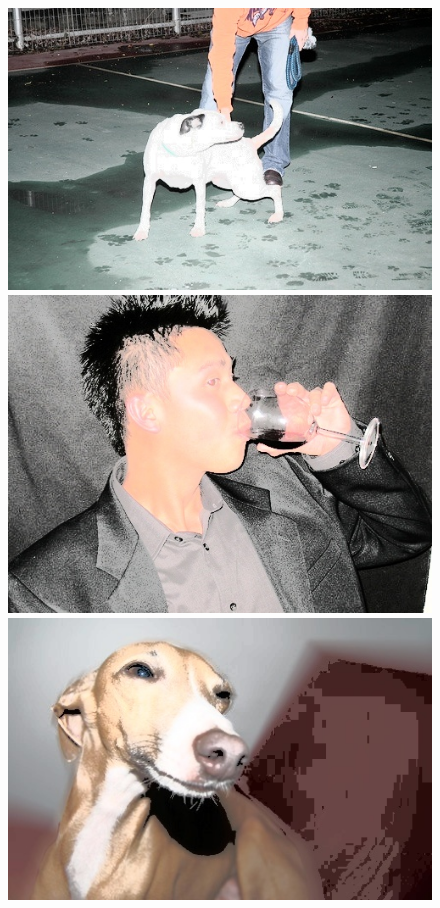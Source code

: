 \begin{appendices}
\begin{figure}[htb]
\begin{minipage}{0.19\textwidth}
\end{minipage}
\begin{minipage}{0.19\textwidth}
\includegraphics[width=\textwidth]{images/anomalien/HA/000777.jpg}
\end{minipage}
\begin{minipage}{0.19\textwidth}
\includegraphics[width=\textwidth]{images/anomalien/HA/001608.jpg}
\end{minipage}
\begin{minipage}{0.19\textwidth}
\includegraphics[width=\textwidth]{images/anomalien/HA/003339.jpg}

\end{minipage}
\end{figure}
\end{appendices}
